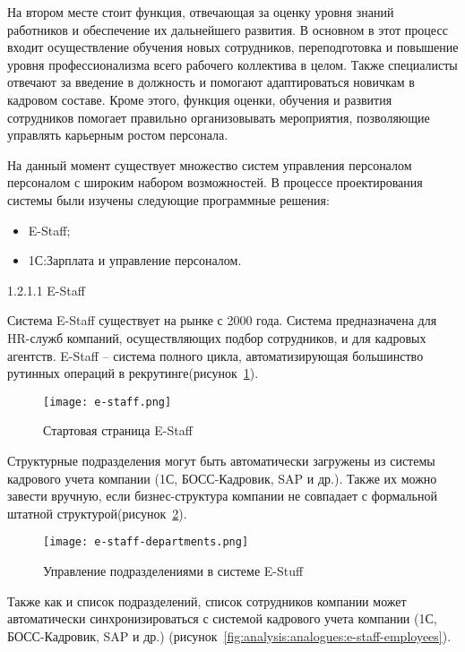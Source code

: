 На втором месте стоит функция, отвечающая за оценку уровня знаний работников и обеспечение их дальнейшего развития.
В основном в этот процесс входит осуществление обучения новых сотрудников, переподготовка и повышение уровня
профессионализма всего рабочего коллектива в целом. Также специалисты отвечают за введение в должность и помогают
адаптироваться новичкам в кадровом составе. Кроме этого, функция оценки, обучения и развития сотрудников помогает
правильно организовывать мероприятия, позволяющие управлять карьерным ростом персонала.

На данный момент существует множество систем управления персоналом персоналом с широким набором возможностей. В
процессе проектирования системы были изучены следующие программные решения:
\begin{itemize}
	\item E-Staff;
	\item 1С:Зарплата и управление персоналом.
\end{itemize}

1.2.1.1 E-Staff

Система E-Staff существует на рынке с 2000 года. Система предназначена для HR-служб компаний, осуществляющих подбор
сотрудников, и для кадровых агентств. E-Staff -- система полного цикла, автоматизирующая большинство рутинных операций
в рекрутинге(рисунок~\ref{fig:analysis:analogues:e-staff}).
\pagebreak

\begin{figure}
	\centering
	\texttt{[image: e-staff.png]} 
	\caption{Стартовая страница E-Staff}
	\label{fig:analysis:analogues:e-staff}
\end{figure}

Структурные подразделения могут быть автоматически загружены из системы кадрового учета компании
(1С, БОСС-Кадровик, SAP и др.). Также их можно завести вручную, если бизнес-структура компании не совпадает с
формальной штатной структурой(рисунок~\ref{fig:analysis:analogues:e-staff-departments}).

\begin{figure}[!h]
	\centering
	\texttt{[image: e-staff-departments.png]} 
	\caption{Управление подразделениями в системе E-Stuff}
	\label{fig:analysis:analogues:e-staff-departments}
\end{figure}

Также как и список подразделений, список сотрудников компании может автоматически синхронизироваться с системой
кадрового учета компании (1С, БОСС-Кадровик, SAP и др.) (рисунок~\ref{fig:analysis:analogues:e-staff-employees}).

